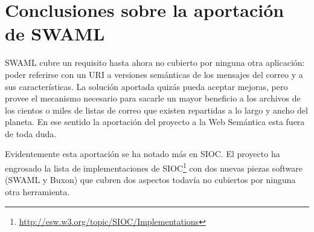 
\section{Conclusiones sobre la aportación de SWAML}

SWAML cubre un requisito hasta ahora no cubierto por ninguna otra aplicación:
poder referirse con un URI a versiones semánticas de los mensajes del correo 
y a sus características. La solución aportada quizás pueda aceptar mejoras,
pero provee el mecanismo necesario para sacarle un mayor beneficio a los
archivos de los cientos o miles de listas de correo que existen repartidas a
lo largo y ancho del planeta. En ese sentido la aportación del proyecto a la
Web Semántica esta fuera de toda duda.

Evidentemente esta aportación se ha notado más en SIOC. El proyecto ha
engrosado la lista de implementaciones de
SIOC\footnote{\url{http://esw.w3.org/topic/SIOC/Implementations}} con dos
nuevas piezas software (SWAML y Buxon) que cubren dos aspectos todavía no
cubiertos por ninguna otra herramienta.

